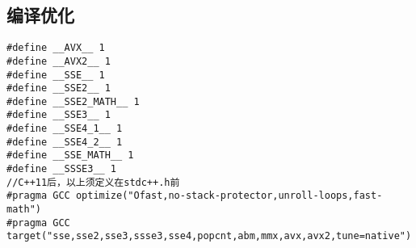 \documentclass[UTF8]{ctexart}
\begin{document}
\subsection{编译优化}
\begin{lstlisting}
#define __AVX__ 1
#define __AVX2__ 1
#define __SSE__ 1
#define __SSE2__ 1
#define __SSE2_MATH__ 1
#define __SSE3__ 1
#define __SSE4_1__ 1
#define __SSE4_2__ 1
#define __SSE_MATH__ 1
#define __SSSE3__ 1
//C++11后，以上须定义在stdc++.h前
#pragma GCC optimize("Ofast,no-stack-protector,unroll-loops,fast-math")
#pragma GCC target("sse,sse2,sse3,ssse3,sse4,popcnt,abm,mmx,avx,avx2,tune=native")
\end{lstlisting}
\end{document}
